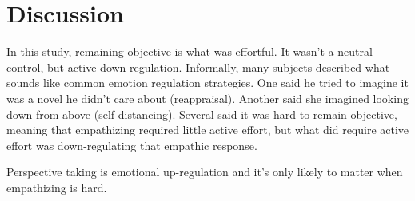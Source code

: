 \documentclass[man,a4paper,noextraspace,apacite]{apa6}\usepackage[]{graphicx}\usepackage[]{color}
\begin{document}
\section{Discussion}

In this study, remaining objective is what was effortful. It wasn't a neutral control, but active down-regulation. Informally, many subjects described what sounds like common emotion regulation strategies. One said he tried to imagine it was a novel he didn't care about (reappraisal). Another said she imagined looking down from above (self-distancing). Several said it was hard to remain objective, meaning that empathizing required little active effort, but what did require active effort was down-regulating that empathic response. 

Perspective taking is emotional up-regulation and it's only likely to matter when empathizing is hard.




\end{document}
